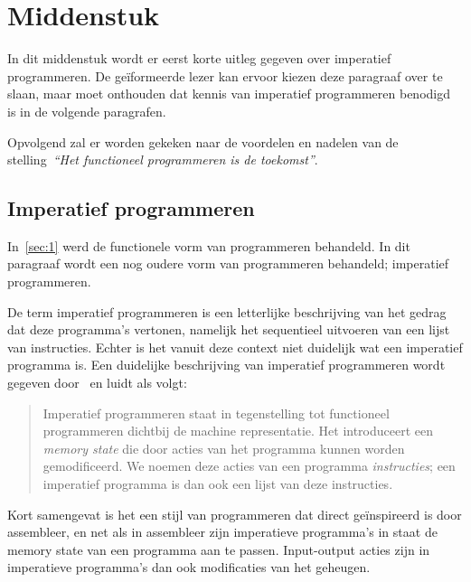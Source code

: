 \documentclass[twoside,twocolumn]{article}
\begin{document}
\section{Middenstuk}
\label{sec:2}

In dit middenstuk wordt er eerst korte uitleg gegeven over imperatief
programmeren. De ge\"iformeerde lezer kan ervoor kiezen deze paragraaf over te
slaan, maar moet onthouden dat kennis van imperatief programmeren benodigd is
in de volgende paragrafen.

Opvolgend zal er worden gekeken naar de voordelen en nadelen van de
stelling~\textit{``Het functioneel programmeren is de toekomst''}.


\subsection{Imperatief programmeren}
\label{subsec:2-1}

In~\cref{sec:1} werd de functionele vorm van programmeren behandeld. In dit
paragraaf wordt een nog oudere vorm van programmeren behandeld; imperatief
programmeren.

De term imperatief programmeren is een letterlijke beschrijving van het gedrag
dat deze programma's vertonen, namelijk het sequentieel uitvoeren van een lijst
van instructies. Echter is het vanuit deze context niet duidelijk wat een
imperatief programma is. Een duidelijke beschrijving van imperatief
programmeren wordt gegeven door~\textcite[hfdst.~3]{src6} en luidt als volgt:

\begin{quote}
  Imperatief programmeren staat in tegenstelling tot functioneel programmeren
  dichtbij de machine representatie. Het introduceert een \textit{memory state}
  die door acties van het programma kunnen worden gemodificeerd. We noemen deze
  acties van een programma \textit{instructies}; een imperatief programma is
  dan ook een lijst van deze instructies.
\end{quote}

Kort samengevat is het een stijl van programmeren dat direct ge\"inspireerd is
door assembleer, en net als in assembleer zijn imperatieve programma's in staat
de memory state van een programma aan te passen. Input-output acties zijn in
imperatieve programma's dan ook modificaties van het geheugen.

\end{document}
